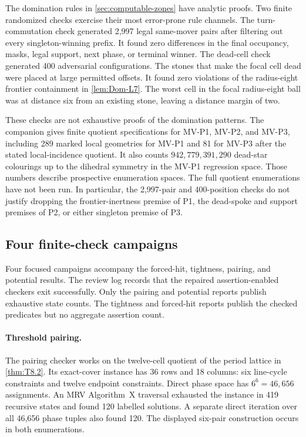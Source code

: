 The domination rules in \cref{sec:computable-zones} have analytic proofs.
Two finite randomized checks exercise their most error-prone rule channels.
The turn-commutation check generated 2,997 legal same-mover pairs after
filtering out every singleton-winning prefix.  It found zero differences in
the final occupancy, masks, legal support, next phase, or terminal winner.
The dead-cell check generated 400 adversarial configurations.  The stones
that make the focal cell dead were placed at large permitted offsets.  It
found zero violations of the radius-eight frontier containment in
\cref{lem:Dom-L7}.  The worst cell in the focal radius-eight ball was at
distance six from an existing stone, leaving a distance margin of two.

These checks are not exhaustive proofs of the domination patterns.  The
companion gives finite quotient specifications for MV-P1, MV-P2, and MV-P3,
including 289 marked local geometries for MV-P1 and 81 for MV-P3 after the
stated local-incidence quotient.  It also counts
$942{,}779{,}391{,}290$ dead-star colourings up to the dihedral symmetry in
the MV-P1 regression space.  Those numbers describe prospective enumeration
spaces.  The full quotient enumerations have not been run.  In particular,
the 2,997-pair and 400-position checks do not justify dropping the
frontier-inertness premise of P1, the dead-spoke and support premises of P2,
or either singleton premise of P3.

\subsection{Four finite-check campaigns}

Four focused campaigns accompany the forced-hit, tightness, pairing, and
potential results.  The review log records that the repaired
assertion-enabled checkers exit successfully.  Only the pairing and potential
reports publish exhaustive state counts.  The tightness and forced-hit
reports publish the checked predicates but no aggregate assertion count.

\paragraph{Threshold pairing.}
The pairing checker works on the twelve-cell quotient of the period lattice
in \cref{thm:T8.2}.  Its exact-cover instance has 36 rows and 18 columns: six
line-cycle constraints and twelve endpoint constraints.  Direct phase space
has $6^6=46{,}656$ assignments.  An MRV Algorithm~X traversal exhausted the
instance in 419 recursive states and found 120 labelled solutions.  A
separate direct iteration over all 46,656 phase tuples also found 120.  The
displayed six-pair construction occurs in both enumerations.

